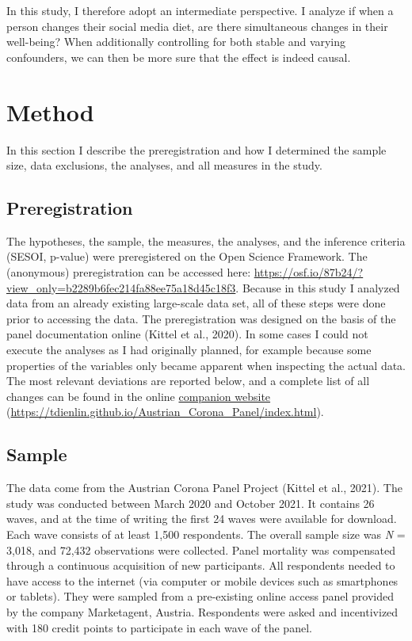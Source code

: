 \documentclass[
  english,
  man,mask,floatsintext]{apa6}
\begin{document}
In this study, I therefore adopt an intermediate perspective.
I analyze if when a person changes their social media diet, are there simultaneous changes in their well-being?
When additionally controlling for both stable and varying confounders, we can then be more sure that the effect is indeed causal.

\hypertarget{method}{%
\section{Method}\label{method}}

In this section I describe the preregistration and how I determined the sample size, data exclusions, the analyses, and all measures in the study.

\hypertarget{preregistration}{%
\subsection{Preregistration}\label{preregistration}}

The hypotheses, the sample, the measures, the analyses, and the inference criteria (SESOI, p-value) were preregistered on the Open Science Framework.
The (anonymous) preregistration can be accessed here: \url{https://osf.io/87b24/?view_only=b2289b6fec214fa88ee75a18d45c18f3}.
Because in this study I analyzed data from an already existing large-scale data set, all of these steps were done prior to accessing the data.
The preregistration was designed on the basis of the panel documentation online (Kittel et al., 2020).
In some cases I could not execute the analyses as I had originally planned, for example because some properties of the variables only became apparent when inspecting the actual data.
The most relevant deviations are reported below, and a complete list of all changes can be found in the online \href{https://tdienlin.github.io/Austrian_Corona_Panel/index.html}{companion website} (\url{https://tdienlin.github.io/Austrian_Corona_Panel/index.html}).

\hypertarget{sample}{%
\subsection{Sample}\label{sample}}

The data come from the Austrian Corona Panel Project (Kittel et al., 2021).
The study was conducted between March 2020 and October 2021.
It contains 26 waves, and at the time of writing the first 24 waves were available for download.
Each wave consists of at least 1,500 respondents.
The overall sample size was \emph{N} = 3,018, and 72,432 observations were collected.
Panel mortality was compensated through a continuous acquisition of new participants.
All respondents needed to have access to the internet (via computer or mobile devices such as smartphones or tablets).
They were sampled from a pre-existing online access panel provided by the company Marketagent, Austria.
Respondents were asked and incentivized with 180 credit points to participate in each wave of the panel.
\end{document}
